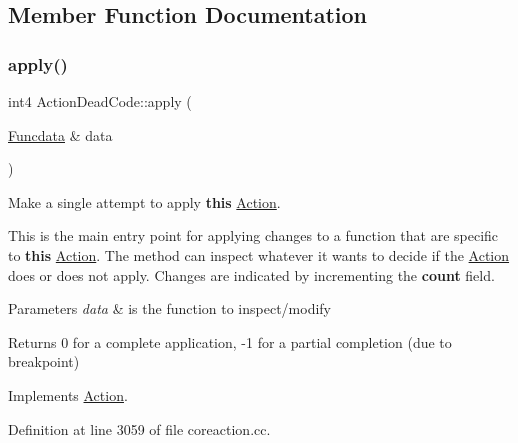 \subsection{Member Function Documentation}
\mbox{\label{class_action_dead_code_a8fc0f3220ac7b0fef4613ba3666d9af9}} 
\subsubsection{\texorpdfstring{apply()}{apply()}}
{\footnotesize\ttfamily int4 Action\+Dead\+Code\+::apply (\begin{DoxyParamCaption}\item[{\mbox{\hyperlink{class_funcdata}{Funcdata}} \&}]{data }\end{DoxyParamCaption})\hspace{0.3cm}{\ttfamily [virtual]}}



Make a single attempt to apply {\bfseries{this}} \mbox{\hyperlink{class_action}{Action}}. 

This is the main entry point for applying changes to a function that are specific to {\bfseries{this}} \mbox{\hyperlink{class_action}{Action}}. The method can inspect whatever it wants to decide if the \mbox{\hyperlink{class_action}{Action}} does or does not apply. Changes are indicated by incrementing the {\bfseries{count}} field. 
\begin{DoxyParams}{Parameters}
{\em data} & is the function to inspect/modify \\
\hline
\end{DoxyParams}
\begin{DoxyReturn}{Returns}
0 for a complete application, -\/1 for a partial completion (due to breakpoint) 
\end{DoxyReturn}


Implements \mbox{\hyperlink{class_action_aac1c3999d6c685b15f5d9765a4d04173}{Action}}.



Definition at line 3059 of file coreaction.\+cc.

